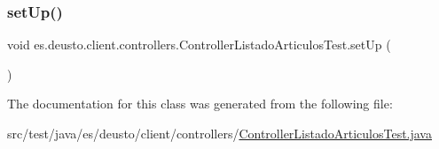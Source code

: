 \subsubsection{\texorpdfstring{setUp()}{setUp()}}
{\footnotesize\ttfamily void es.\+deusto.\+client.\+controllers.\+Controller\+Listado\+Articulos\+Test.\+set\+Up (\begin{DoxyParamCaption}{ }\end{DoxyParamCaption})}



The documentation for this class was generated from the following file\+:\begin{DoxyCompactItemize}
\item 
src/test/java/es/deusto/client/controllers/\mbox{\hyperlink{_controller_listado_articulos_test_8java}{Controller\+Listado\+Articulos\+Test.\+java}}\end{DoxyCompactItemize}
